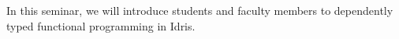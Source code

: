 In this seminar, we will introduce students and faculty members to dependently typed functional programming in Idris.
